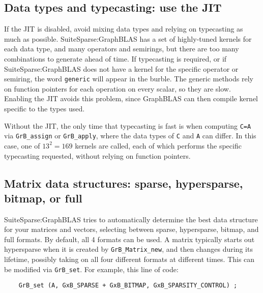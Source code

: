 \documentclass[12pt]{article}
\begin{document}
\subsection{Data types and typecasting: use the JIT}

If the JIT is disabled,
avoid mixing data types and relying on typecasting as much as possible.
SuiteSparse:GraphBLAS has a set of highly-tuned kernels for each data type,
and many operators and semirings, but there are too many combinations to
generate ahead of time.  If typecasting is required, or if
SuiteSparse:GraphBLAS does not have a kernel for the specific operator or
semiring, the word \verb'generic' will appear in the burble.  The generic
methods rely on function pointers for each operation on every scalar, so they
are slow.  Enabling the JIT avoids this problem, since GraphBLAS can then
compile kernel specific to the types used.

Without the JIT,
the only time that typecasting is fast is when computing \verb'C=A' via
\verb'GrB_assign' or \verb'GrB_apply', where the data types of \verb'C' and
\verb'A' can differ.  In this case, one of $13^2 = 169$ kernels are called,
each of which performs the specific typecasting requested, without relying on
function pointers.

\subsection{Matrix data structures: sparse, hypersparse, bitmap, or full}

SuiteSparse:GraphBLAS tries to automatically determine the best data structure
for your matrices and vectors, selecting between sparse, hypersparse, bitmap,
and full formats.  By default, all 4 formats can be used.  A matrix typically
starts out hypersparse when it is created by \verb'GrB_Matrix_new', and then
changes during its lifetime, possibly taking on all four different formats
at different times.  This can be modified via \verb'GrB_set'.  For example,
this line of code:

    {\footnotesize
    \begin{verbatim}
    GrB_set (A, GxB_SPARSE + GxB_BITMAP, GxB_SPARSITY_CONTROL) ; \end{verbatim}}
\end{document}
